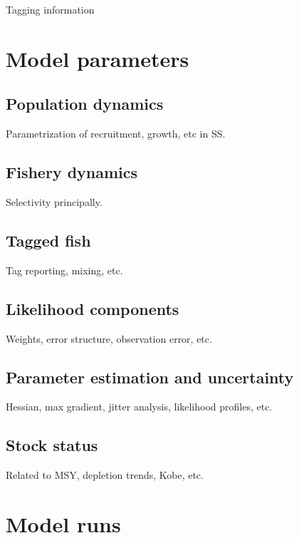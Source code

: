 \documentclass[
]{scrartcl}
\begin{document}
Tagging information

\section{Model parameters}\label{model-parameters}

\subsection{Population dynamics}\label{population-dynamics}

Parametrization of recruitment, growth, etc in SS.

\subsection{Fishery dynamics}\label{fishery-dynamics}

Selectivity principally.

\subsection{Tagged fish}\label{tagged-fish}

Tag reporting, mixing, etc.

\subsection{Likelihood components}\label{likelihood-components}

Weights, error structure, observation error, etc.

\subsection{Parameter estimation and
uncertainty}\label{parameter-estimation-and-uncertainty}

Hessian, max gradient, jitter analysis, likelihood profiles, etc.

\subsection{Stock status}\label{stock-status}

Related to MSY, depletion trends, Kobe, etc.

\section{Model runs}\label{model-runs}
\end{document}
